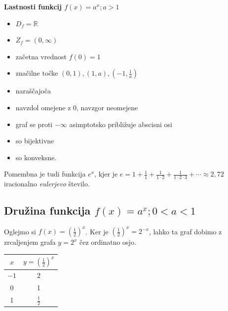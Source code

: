 \documentclass{article}
\begin{document}
\textbf{Lastnosti funkcij $f(x)=a^x; a>1$}
\begin{itemize}
    \item $D_f=\mathbb{R}$
    \item $Z_f=(0,\infty)$
    \item začetna vrednost $f(0)=1$
    \item značilne točke $(0,1),(1,a),\left(-1,\frac{1}{a}\right)$
    \item naraščajoča
    \item navzdol omejene z $0$, navzgor neomejene
    \item graf se proti $-\infty$ asimptotsko približuje abscisni osi
    \item so bijektivne
    \item so konveksne.
\end{itemize}

Pomembna je tudi funkcija $e^x$, kjer je $e=1+\frac{1}{1}+\frac{1}{1\cdot 2}+\frac{1}{1\cdot 2\cdot 3}+\cdots\approx2,72$ iracionalno \textit{eulerjevo} število.

\subsection{Družina funkcija $f(x)=a^x; 0<a<1$}

Oglejmo si $f(x)=\left(\frac{1}{2}\right)^x$. Ker je $\left(\frac{1}{2}\right)^x=2^{-x}$, lahko ta graf dobimo z zrcaljenjem grafa $y=2^x$ čez ordinatno osjo.

\begin{minipage}[c]{0.3\textwidth}
\vspace{0pt}
\begin{tabular}{|c|c|}
\hline
$x$  & $y=\left(\frac{1}{2}\right)^x$       \\ \hline
$-1$ & $2$ \\
0    & 1             \\
1    & $\frac{1}{2}$             \\ \hline
\end{tabular}
\vspace{0pt}
\end{minipage}
\noindent
\begin{minipage}[c]{0.3\textwidth}
\end{minipage}
\end{document}
